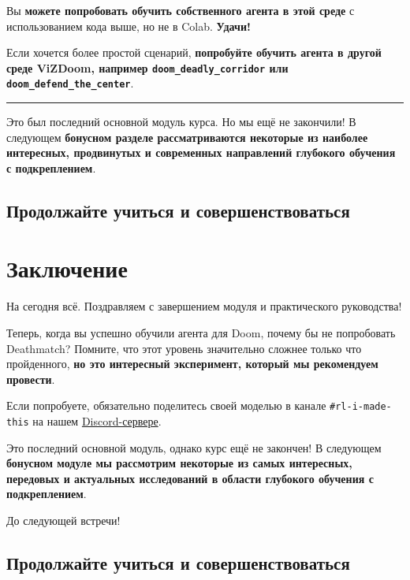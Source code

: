 \documentclass[11pt,a4paper]{article}
\begin{document}
Вы \textbf{можете попробовать обучить собственного агента в этой среде} с использованием кода выше, но не в Colab. \textbf{Удачи!}

Если хочется более простой сценарий, \textbf{попробуйте обучить агента в другой среде ViZDoom, например \texttt{doom\_deadly\_corridor} или \texttt{doom\_defend\_the\_center}}.

\begin{center}\rule{0.5\linewidth}{0.5pt}\end{center}

Это был последний основной модуль курса. Но мы ещё не закончили! В следующем \textbf{бонусном разделе рассматриваются некоторые из наиболее интересных, продвинутых и современных направлений глубокого обучения с подкреплением}.

\subsection{Продолжайте учиться и совершенствоваться}\label{keep-learning-stay-awesome-2}

\section{Заключение}\label{conclusion-1}

На сегодня всё. Поздравляем с завершением модуля и практического руководства!

Теперь, когда вы успешно обучили агента для Doom, почему бы не попробовать Deathmatch? Помните, что этот уровень значительно сложнее только что пройденного, \textbf{но это интересный эксперимент, который мы рекомендуем провести}.

Если попробуете, обязательно поделитесь своей моделью в канале \texttt{\#rl-i-made-this} на нашем \href{https://www.hf.co/join/discord}{Discord-сервере}.

Это последний основной модуль, однако курс ещё не закончен! В следующем \textbf{бонусном модуле мы рассмотрим некоторые из самых интересных, передовых и актуальных исследований в области глубокого обучения с подкреплением}.

До следующей встречи!

\subsection{Продолжайте учиться и совершенствоваться}\label{keep-learning-stay-awesome-3}
\end{document}
